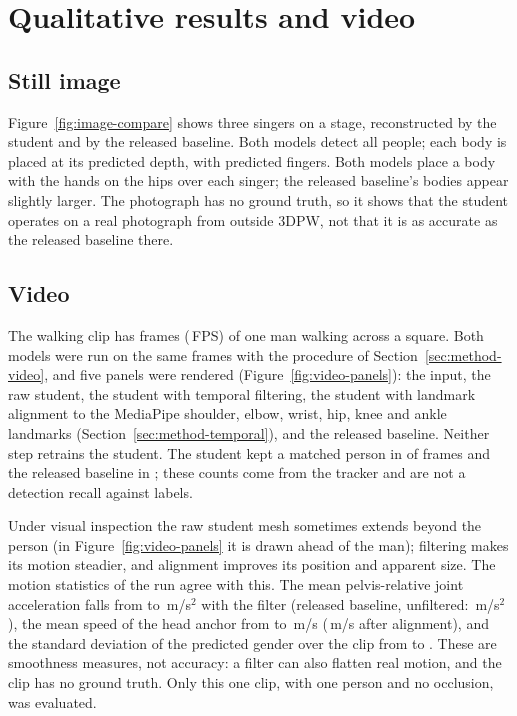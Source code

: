 
\section{Qualitative results and video}
\label{sec:res-video}

\subsection{Still image}
\label{sec:res-image-compare}



Figure~\ref{fig:image-compare} shows three singers on a stage, reconstructed by the student and by the released
baseline. Both models detect all \ImageCompareDetections{} people; each body is placed at its predicted
depth, with predicted fingers. Both models place a body with the hands on the hips over each singer; the released baseline's
bodies appear slightly larger. The photograph has no ground truth, so it shows that the student operates on a real
photograph from outside 3DPW, not that it is as accurate as the released baseline there.

\subsection{Video}




The walking clip has \VideoFrames{} frames (\VideoPlaybackFPS\,FPS) of one man walking across a square. Both models were run on the same
frames with the procedure of Section~\ref{sec:method-video}, and five panels were rendered
(Figure~\ref{fig:video-panels}): the input, the raw student, the student with temporal filtering, the student with
landmark alignment to the MediaPipe shoulder, elbow, wrist, hip, knee and ankle landmarks
(Section~\ref{sec:method-temporal}), and the released baseline. Neither step retrains the student. The student kept
a matched person in \VideoStudentMatched{} of \VideoFrames{} frames and the released baseline in
\VideoBaselineMatched; these counts come from the tracker and are not a detection recall against labels.

Under visual inspection the raw student mesh sometimes extends beyond the person (in
Figure~\ref{fig:video-panels} it is drawn ahead of the man); filtering makes its motion steadier, and alignment
improves its position and apparent size. The motion statistics of the run agree with this. The mean pelvis-relative joint acceleration falls from
\VideoAccelRaw{} to \VideoAccelTemporal\,m/s$^2$ with the filter (released baseline, unfiltered:
\VideoAccelNAVER\,m/s$^2$), the mean speed of the head anchor from \VideoRootSpeedRaw{} to
\VideoRootSpeedTemporal\,m/s (\VideoRootSpeedAligned\,m/s after alignment), and the standard deviation of the
predicted gender over the clip from \VideoGenderStdRaw{} to \VideoGenderStdTemporal. These are smoothness measures,
not accuracy: a filter can also flatten real motion, and the clip has no ground truth. Only this one clip, with one
person and no occlusion, was evaluated.


